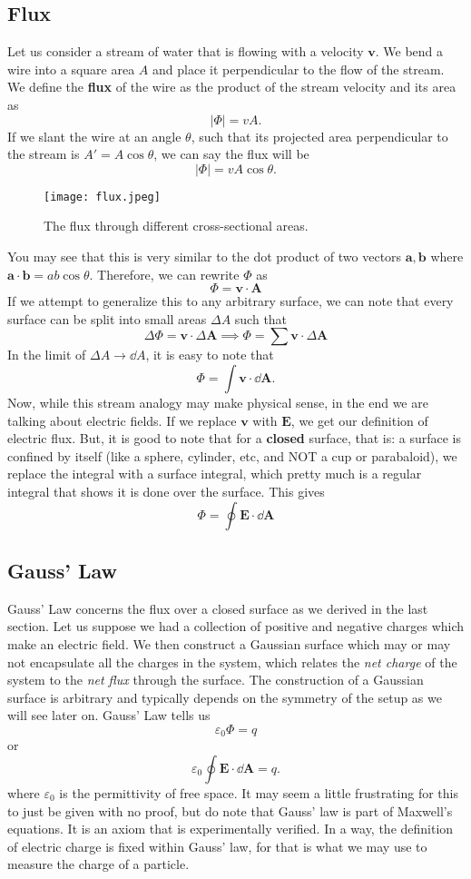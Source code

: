 \documentclass[12pt]{article}
\let\vec\mathbf
\begin{document}
  \subsection{Flux}
  Let us consider a stream of water that is flowing with a velocity $\vec v$. We bend a wire into a square area $A$ and place it perpendicular to the flow of the stream. We define the \textbf{flux} of the wire as the product of the stream velocity and its area as
  \[|\Phi| = vA.\]
  If we slant the wire at an angle $\theta$, such that its projected area perpendicular to the stream is $A' = A\cos\theta$, we can say the flux will be 
  \[|\Phi| = vA\cos\theta.\]
    \begin{figure}[H]
  \centering
      \texttt{[image: flux.jpeg]}
      \caption{The flux through different cross-sectional areas.}
  \end{figure}
  You may see that this is very similar to the dot product of two vectors $\vec a, \vec b$ where $\vec a \cdot \vec b = ab\cos\theta$. Therefore, we can rewrite $\Phi$ as
  \[\Phi = \vec v \cdot \vec A\]
  If we attempt to generalize this to any arbitrary surface, we can note that every surface can be split into small areas $\Delta A$ such that 
  \[\Delta \Phi = \vec v \cdot \Delta \vec A\implies \Phi = \sum \vec v \cdot \Delta \vec A\]
  In the limit of $\Delta A\to \dd A$, it is easy to note that
  \[\Phi = \int \vec v \cdot \dd \vec A.\]
  Now, while this stream analogy may make physical sense, in the end we are talking about electric fields. If we replace $\vec v$ with $\vec E$, we get our definition of electric flux. But, it is good to note that for a \textbf{closed} surface, that is: a surface is confined by itself (like a sphere, cylinder, etc, and NOT a cup or parabaloid), we replace the integral with a surface integral, which pretty much is a regular integral that shows it is done over the surface. This gives 
  \[\Phi = \oint \vec E \cdot \dd \vec A\]
  \subsection{Gauss' Law}
  Gauss' Law concerns the flux over a closed surface as we derived in the last section. Let us suppose we had a collection of positive and negative charges which make an electric field. We then construct a Gaussian surface which may or may not encapsulate all the charges in the system, which relates the \textit{net charge} of the system to the \textit{net flux} through the surface. The construction of a Gaussian surface is arbitrary and typically depends on the symmetry of the setup as we will see later on. Gauss' Law tells us 
  \[\varepsilon_0 \Phi = q\]
  or 
  \[\varepsilon_0 \oint \vec E \cdot \dd \vec A = q.\]
  where $\varepsilon_0$ is the permittivity of free space. It may seem a little frustrating for this to just be given with no proof, but do note that Gauss' law is part of Maxwell's equations. It is an axiom that is experimentally verified. In a way, the definition of electric charge is fixed within Gauss' law, for that is what we may use to measure the charge of a particle. 
\end{document}
